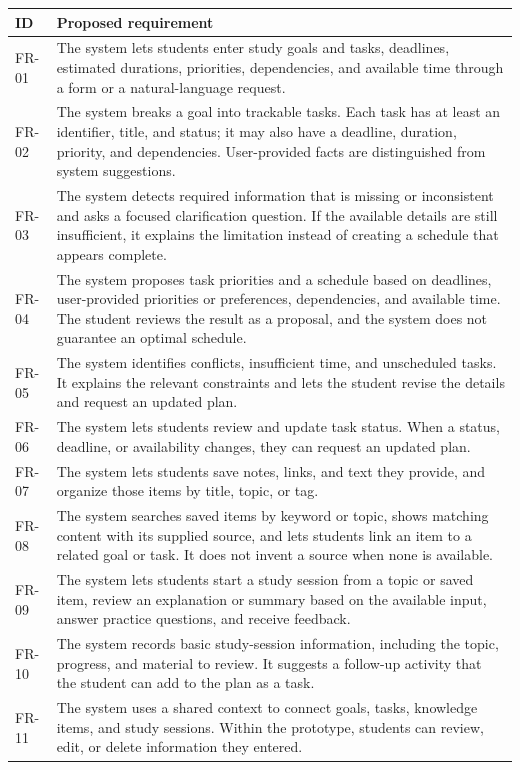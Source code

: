 \begin{longtable}{|>{\raggedright\arraybackslash}p{1.5cm}|>{\raggedright\arraybackslash}p{13.5cm}|}
\hline
\textbf{ID} & \textbf{Proposed requirement} \\ \hline
\endhead
FR-01 & The system lets students enter study goals and tasks, deadlines, estimated durations, priorities, dependencies, and available time through a form or a natural-language request. \\ \hline
FR-02 & The system breaks a goal into trackable tasks. Each task has at least an identifier, title, and status; it may also have a deadline, duration, priority, and dependencies. User-provided facts are distinguished from system suggestions. \\ \hline
FR-03 & The system detects required information that is missing or inconsistent and asks a focused clarification question. If the available details are still insufficient, it explains the limitation instead of creating a schedule that appears complete. \\ \hline
FR-04 & The system proposes task priorities and a schedule based on deadlines, user-provided priorities or preferences, dependencies, and available time. The student reviews the result as a proposal, and the system does not guarantee an optimal schedule. \\ \hline
FR-05 & The system identifies conflicts, insufficient time, and unscheduled tasks. It explains the relevant constraints and lets the student revise the details and request an updated plan. \\ \hline
FR-06 & The system lets students review and update task status. When a status, deadline, or availability changes, they can request an updated plan. \\ \hline
FR-07 & The system lets students save notes, links, and text they provide, and organize those items by title, topic, or tag. \\ \hline
FR-08 & The system searches saved items by keyword or topic, shows matching content with its supplied source, and lets students link an item to a related goal or task. It does not invent a source when none is available. \\ \hline
FR-09 & The system lets students start a study session from a topic or saved item, review an explanation or summary based on the available input, answer practice questions, and receive feedback. \\ \hline
FR-10 & The system records basic study-session information, including the topic, progress, and material to review. It suggests a follow-up activity that the student can add to the plan as a task. \\ \hline
FR-11 & The system uses a shared context to connect goals, tasks, knowledge items, and study sessions. Within the prototype, students can review, edit, or delete information they entered. \\ \hline
\end{longtable}

